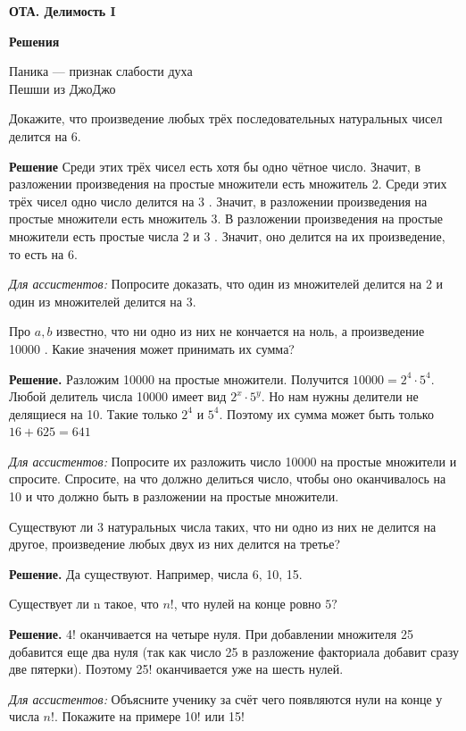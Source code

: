 \centerline{\bf \Huge ОТА. Делимость I}
\centerline{\bf \Huge Решения}

\begin{flushright}
        \scriptsize{Паника — признак слабости духа\\Пешши из ДжоДжо}
\end{flushright}

Докажите, что произведение любых трёх последовательных натуральных чисел делится на 6.

\textbf{Решение}
Среди этих трёх чисел есть хотя бы одно чётное число. Значит, в разложении произведения на простые множители есть множитель 2. Среди этих трёх чисел одно число делится на 3 . Значит, в разложении произведения на простые множители есть множитель 3. В разложении произведения на простые множители есть простые числа 2 и 3 . Значит, оно делится на их произведение, то есть на 6.

\textit{Для ассистентов:} Попросите доказать, что один из множителей делится на 2 и один из множителей делится на 3.

Про $a, b$ известно, что ни одно из них не кончается на ноль, а произведение 10000 . Какие значения может принимать их сумма?

\textbf{Решение.} Разложим 10000 на простые множители. Получится $10000 = 2^4\cdot5^4$. Любой делитель числа 10000 имеет вид $2^x\cdot5^y$. Но нам нужны делители не делящиеся на 10. Такие только $2^4$ и $5^4$. Поэтому их сумма может быть только $16+625 = 641$

\textit{Для ассистентов:} Попросите их разложить число 10000 на простые множители и спросите. Спросите, на что должно делиться число, чтобы оно оканчивалось на 10 и что должно быть в разложении на простые множители.

Существуют ли 3 натуральных числа таких, что ни одно из них не делится на другое, произведение любых двух из них делится на третье?

\textbf{Решение.} Да существуют. Например, числа 6, 10, 15.

Существует ли n такое, что $n!$, что нулей на конце ровно $5?$

\textbf{Решение.} 
4! оканчивается на четыре нуля. При добавлении множителя 25 добавится еще два нуля (так как число 25 в разложение факториала добавит сразу две пятерки). Поэтому 25! оканчивается уже на шесть нулей.

\textit{Для ассистентов:}
Объясните ученику за счёт чего появляются нули на конце у числа $n!$. Покажите на примере 10! или 15!

